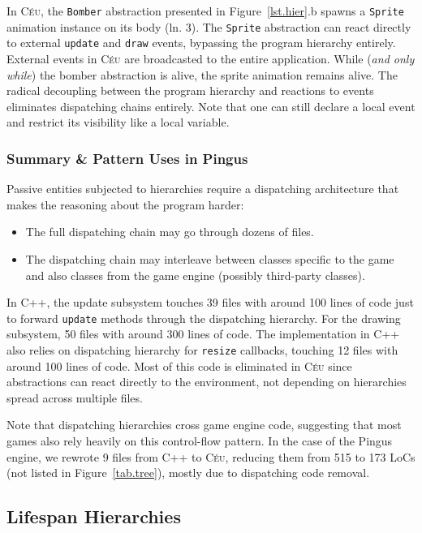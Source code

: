 \documentclass{vgtc}                          %
\newcommand{\CEU}{\textsc{C\'{e}u}\xspace}
\newcommand{\code}[1] {{\small{\texttt{#1}}}}
\begin{document}
In \CEU, the \code{Bomber} abstraction presented in Figure~\ref{lst.hier}.b
spawns a \code{Sprite} animation instance on its body (ln. 3).
%
The \code{Sprite} abstraction can react directly to external \code{update}
and \code{draw} events, bypassing the program hierarchy entirely.
External events in \CEU are broadcasted to the entire application.
While (\emph{and only while}) the bomber abstraction is alive, the sprite
animation remains alive.
The radical decoupling between the program hierarchy and reactions to events
eliminates dispatching chains entirely.
Note that one can still declare a local event and restrict its visibility like
a local variable.

\subsubsection{Summary \& Pattern Uses in Pingus}

Passive entities subjected to hierarchies require a dispatching architecture
that makes the reasoning about the program harder:

\begin{itemize}
\item The full dispatching chain may go through dozens of files.
\item The dispatching chain may interleave between classes specific to the game
      and also classes from the game engine (possibly third-party classes).
\end{itemize}

In C++, the update subsystem touches 39 files with around 100 lines of code
just to forward \code{update} methods through the dispatching hierarchy.
For the drawing subsystem, 50 files with around 300 lines of code.
The implementation in C++ also relies on dispatching hierarchy for
\code{resize} callbacks, touching 12 files with around 100 lines of code.
%
Most of this code is eliminated in \CEU since abstractions can react directly
to the environment, not depending on hierarchies spread across multiple files.

Note that dispatching hierarchies cross game engine code, suggesting that most
games also rely heavily on this control-flow pattern.
In the case of the Pingus engine, we rewrote 9 files from C++ to \CEU, reducing
them from 515 to 173 LoCs (not listed in Figure~\ref{tab.tree}), mostly due to
dispatching code removal.

\subsection{Lifespan Hierarchies}
\label{sec.pats.lifespan}
\end{document}
